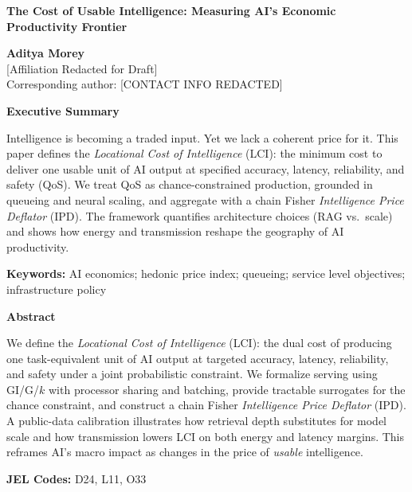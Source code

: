 \documentclass[12pt]{article}
\numberwithin{equation}{section}
\begin{document}
\begin{center}
{\LARGE \textbf{The Cost of Usable Intelligence: Measuring AI’s Economic Productivity Frontier}}

\vspace{0.6cm}
\textbf{Aditya Morey}\\[4pt]
\small{[Affiliation Redacted for Draft]}\\[4pt]
\small{Corresponding author: [CONTACT INFO REDACTED]}\\[8pt]
\end{center}

\noindent\textbf{Executive Summary}  

\noindent Intelligence is becoming a traded input. Yet we lack a coherent price for it.  
This paper defines the \emph{Locational Cost of Intelligence} (LCI): the minimum cost to deliver one usable unit of AI output at specified accuracy, latency, reliability, and safety (QoS).  
We treat QoS as chance-constrained production, grounded in queueing and neural scaling, and aggregate with a chain Fisher \emph{Intelligence Price Deflator} (IPD).  
The framework quantifies architecture choices (RAG vs.\ scale) and shows how energy and transmission reshape the geography of AI productivity.

\vspace{0.6em}
\noindent\textbf{Keywords:} AI economics; hedonic price index; queueing; service level objectives; infrastructure policy

\newpage

\noindent\textbf{Abstract}  

\noindent We define the \emph{Locational Cost of Intelligence} (LCI): the dual cost of producing one task-equivalent unit of AI output at targeted accuracy, latency, reliability, and safety under a joint probabilistic constraint.  
We formalize serving using GI/G/$k$ with processor sharing and batching, provide tractable surrogates for the chance constraint, and construct a chain Fisher \emph{Intelligence Price Deflator} (IPD).  
A public-data calibration illustrates how retrieval depth substitutes for model scale and how transmission lowers LCI on both energy and latency margins.  
This reframes AI’s macro impact as changes in the price of \emph{usable} intelligence.

\vspace{0.3cm}
\noindent\textbf{JEL Codes:} D24, L11, O33
\end{document}

